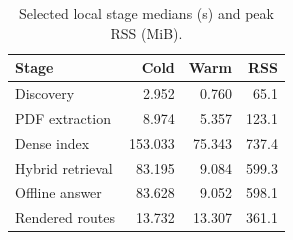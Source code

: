 \begin{table}[t]
\caption{Selected local stage medians (s) and peak RSS (MiB).}
\label{tab:performance}
\centering
\scriptsize
\begin{tabular}{@{}lrrr@{}}
\toprule
Stage & Cold & Warm & RSS \\
\midrule
Discovery & 2.952 & 0.760 & 65.1 \\
PDF extraction & 8.974 & 5.357 & 123.1 \\
Dense index & 153.033 & 75.343 & 737.4 \\
Hybrid retrieval & 83.195 & 9.084 & 599.3 \\
Offline answer & 83.628 & 9.052 & 598.1 \\
Rendered routes & 13.732 & 13.307 & 361.1 \\
\bottomrule
\end{tabular}
\end{table}
